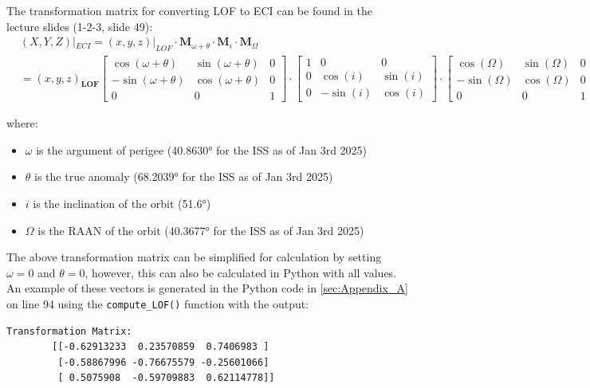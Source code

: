 \begin{itemize}
    The transformation matrix for converting LOF to ECI can be found in the lecture slides (1-2-3, slide 49):
    \tiny
    \begin{equation}
    \label{eq:LOF-ECI_transformation_matrix}
    \begin{split}
        &(X, Y, Z)|_{ECI} = (x, y, z)|_{LOF} \cdot \textbf{M}_{\omega + \theta} \cdot \mathbf{M}_{i} \cdot \mathbf{M}_{\Omega} \\
        &= (x, y, z)_{\mathbf{LOF}}
        \begin{bmatrix}
            \cos(\omega + \theta) & \sin(\omega + \theta) & 0 \\
            -\sin(\omega + \theta) & \cos(\omega + \theta) & 0 \\
            0 & 0 & 1
        \end{bmatrix}
        \cdot
        \begin{bmatrix}
            1 & 0 & 0 \\
            0 & \cos(i) & \sin(i) \\
            0 & -\sin(i) & \cos(i)
        \end{bmatrix}
        \cdot
        \begin{bmatrix}
            \cos(\Omega) & \sin(\Omega) & 0 \\
            -\sin(\Omega) & \cos(\Omega) & 0 \\
            0 & 0 & 1
        \end{bmatrix}
    \end{split}
    \end{equation}
    \normalsize

    where:
    \begin{itemize}
       \item $\omega$ is the argument of perigee (40.8630° for the ISS as of Jan 3rd 2025) \cite{ISS_orbit_parameters} 
       \item $\theta$ is the true anomaly (68.2039° for the ISS as of Jan 3rd 2025)   \cite{ISS_orbit_parameters}      
       \item $i$ is the inclination of the orbit (51.6°)
       \item $\Omega$ is the RAAN of the orbit (40.3677° for the ISS as of Jan 3rd 2025) \cite{ISS_orbit_parameters}
    \end{itemize}

    The above transformation matrix can be simplified for calculation by setting $\omega = 0$ and $\theta = 0$, however, this can also be calculated in Python with all values. 
    An example of these vectors is generated in the Python code in \autoref{sec:Appendix_A} on line 94 using the \verb|compute_LOF()| function with the output:
    \begin{lstlisting}[frame=single]
        Transformation Matrix:        
        [[-0.62913233  0.23570859  0.7406983 ]
         [-0.58867996 -0.76675579 -0.25601066]
         [ 0.5075908  -0.59709883  0.62114778]]
        

\end{lstlisting}
\end{itemize}
